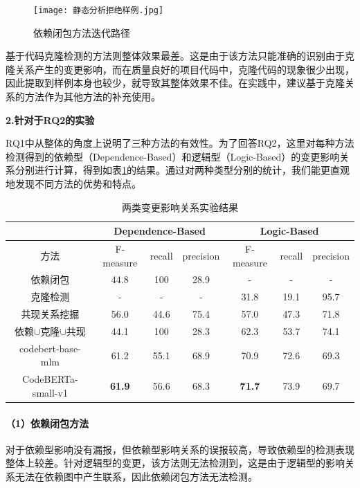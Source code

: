 \begin{figure}[htbp]
\centering
\texttt{[image: 静态分析拒绝样例.jpg]}
\caption{依赖闭包方法迭代路径}
\label{1_依赖闭包方法迭代路径}
\end{figure}


基于代码克隆检测的方法则整体效果最差。这是由于该方法只能准确的识别由于克隆关系产生的变更影响，而在质量良好的项目代码中，克隆代码的现象很少出现，因此提取到样例本身也较少，就导致其整体效果不佳。在实践中，建议基于克隆关系的方法作为其他方法的补充使用。

\textbf{2.针对于RQ2的实验}

RQ1中从整体的角度上说明了三种方法的有效性。为了回答RQ2，这里对每种方法检测得到的依赖型（Dependence-Based）和逻辑型（Logic-Based）的变更影响关系分别进行计算，得到如表\ref{1_两类变更影响关系实验结果}的结果。通过对两种类型分别的统计，我们能更直观地发现不同方法的优势和特点。


\begin{table}[htbp]
\caption{两类变更影响关系实验结果}
\label{1_两类变更影响关系实验结果}
\vspace{0.5em}\centering\wuhao
\begin{tabular}{c|ccc|ccc}
\toprule
  & \multicolumn{3}{c|}{Dependence-Based} & \multicolumn{3}{c}{Logic-Based}  \\
\midrule
方法 & F-measure & recall & precision & F-measure & recall & precision  \\
\midrule
依赖闭包 &  44.8 & 100 & 28.9 & - & - & -  \\
克隆检测 &  - & - & - & 31.8 & 19.1 & 95.7 \\
共现关系挖掘 &  56.0 & 44.6 & 75.4 & 57.0 & 47.3 & 71.8 \\
依赖$\cup$克隆$\cup$共现 &  44.1 & 100 & 28.3 & 62.3 & 53.7 & 74.1 \\
codebert-base-mlm &   61.2 & 55.1 & 68.9 & 70.9 & 72.6 & 69.3 \\
CodeBERTa-small-v1 &   \textbf{61.9} & 56.6 & 68.3 & \textbf{71.7} & 73.9 & 69.7 \\
\bottomrule
\end{tabular}
\end{table}


\paragraph{（1）依赖闭包方法} 对于依赖型影响没有漏报，但依赖型影响关系的误报较高，导致依赖型的检测表现整体上较差。针对逻辑型的变更，该方法则无法检测到，这是由于逻辑型的影响关系无法在依赖图中产生联系，因此依赖闭包方法无法检测。
    
